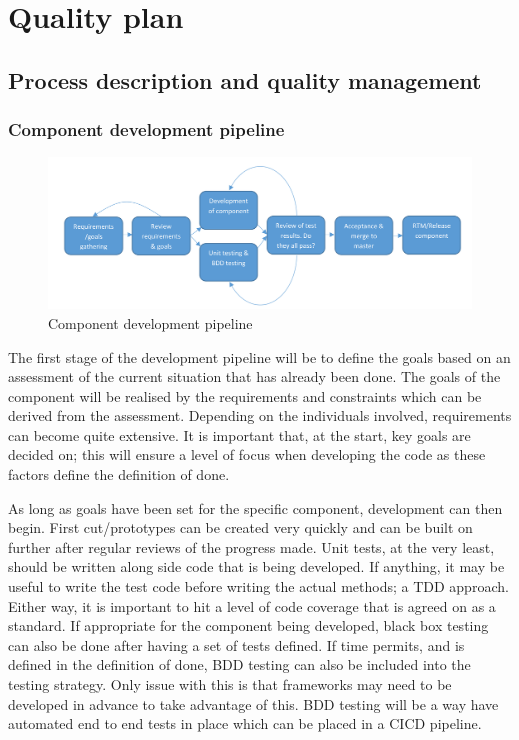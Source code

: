 \section{Quality plan}

\subsection{Process description and quality management}

\subsubsection{Component development pipeline}
\begin{figure}[H]
    \centering
    \includegraphics[width=1\textwidth]{images/component_dev_pipeline.png}
    \caption{Component development pipeline}
    \label{componentdevpipeline}
\end{figure}

The first stage of the development pipeline will be to define the goals based on an assessment of the
current situation that has already been done. The goals of the component will be realised by the
requirements and constraints which can be derived from the assessment. Depending on the
individuals involved, requirements can become quite extensive. It is important that, at the start, key
goals are decided on; this will ensure a level of focus when developing the code as these factors
define the definition of done.

As long as goals have been set for the specific component, development can then begin. First
cut/prototypes can be created very quickly and can be built on further after regular reviews of the
progress made. Unit tests, at the very least, should be written along side code that is being
developed. If anything, it may be useful to write the test code before writing the actual methods; a
TDD approach. Either way, it is important to hit a level of code coverage that is agreed on as a
standard. If appropriate for the component being developed, black box testing can also be done
after having a set of tests defined. If time permits, and is defined in the definition of done, BDD
testing can also be included into the testing strategy. Only issue with this is that frameworks may
need to be developed in advance to take advantage of this. BDD testing will be a way have
automated end to end tests in place which can be placed in a CICD pipeline.

